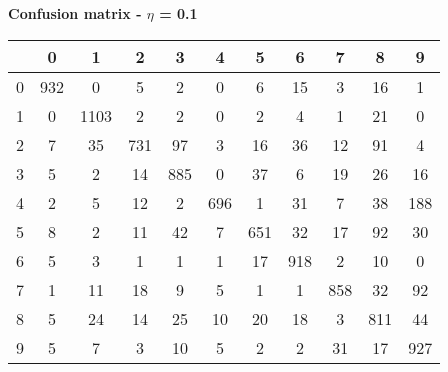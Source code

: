 \documentclass{article}
\begin{document}
\begin{table}[h!]
    \begin{center}
        \centerline\textbf{{Confusion matrix - $\eta$ = 0.1}}
        \begin{tabular}{| c | c | c | c | c | c | c | c | c | c | c |}
            \hline
              & 0 & 1 & 2 & 3 & 4 & 5 & 6 & 7 & 8 & 9 \\ 
            \hline
            0 & 932 & 0 & 5 & 2 & 0 & 6 & 15 & 3 & 16 & 1 \\
            \hline
            1 & 0 & 1103 & 2 & 2 & 0 & 2 & 4 & 1 & 21 & 0 \\
            \hline
            2 & 7 & 35 & 731 & 97 & 3 & 16 & 36 & 12 & 91 & 4 \\
            \hline
            3 & 5 & 2 & 14 & 885 & 0 & 37 & 6 & 19 & 26 & 16 \\
            \hline
            4 & 2 & 5 & 12 & 2 & 696 & 1 & 31 & 7 & 38 & 188 \\
            \hline
            5 & 8 & 2 & 11 & 42 & 7 & 651 & 32 & 17 & 92 & 30 \\
            \hline
            6 & 5 & 3 & 1 & 1 & 1 & 17 & 918 & 2 & 10 & 0 \\
            \hline
            7 & 1 & 11 & 18 & 9 & 5 & 1 & 1 & 858 & 32 & 92 \\
            \hline
            8 & 5 & 24 & 14 & 25 & 10 & 20 & 18 & 3 & 811 & 44 \\
            \hline
            9 & 5 & 7 & 3 & 10 & 5 & 2 & 2 & 31 & 17 & 927 \\
            \hline
         \end{tabular}
    \end{center}
\end{table}
\end{document}
